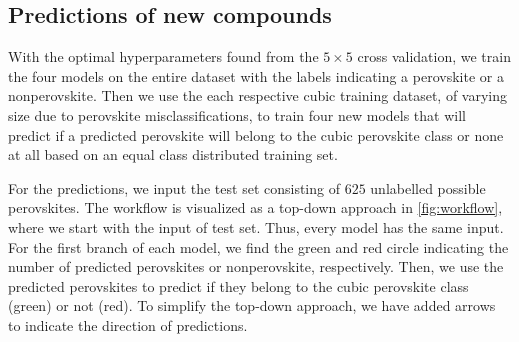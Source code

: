 \begin{table}[!ht]
\centering
\caption{Table with corresponding best estimators during a grid search scheme for predicting cubic perovskites or only perovskites. The test score is here referred to as a balanced accuracy score, and we list all standard deviations in parentheses.}
\label{tab:cubic-optimal}
\noindent{}
\end{table}


\subsection{Predictions of new compounds}

With the optimal hyperparameters found from the $5\times5$ cross validation, we train the four models on the entire dataset with the labels indicating a perovskite or a nonperovskite. Then we use the each respective cubic training dataset, of varying size due to perovskite misclassifications, to train four new models that will predict if a predicted perovskite will belong to the cubic perovskite class or none at all based on an equal class distributed training set.



For the predictions, we input the test set consisting of $625$ unlabelled possible perovskites. The workflow is visualized as a top-down approach in \autoref{fig:workflow}, where we start with the input of test set. Thus, every model has the same input. For the first branch of each model, we find the green and red circle indicating the number of predicted perovskites or nonperovskite, respectively. Then, we use the predicted perovskites to predict if they belong to the cubic perovskite class (green) or not (red). To simplify the top-down approach, we have added arrows to indicate the direction of predictions.


